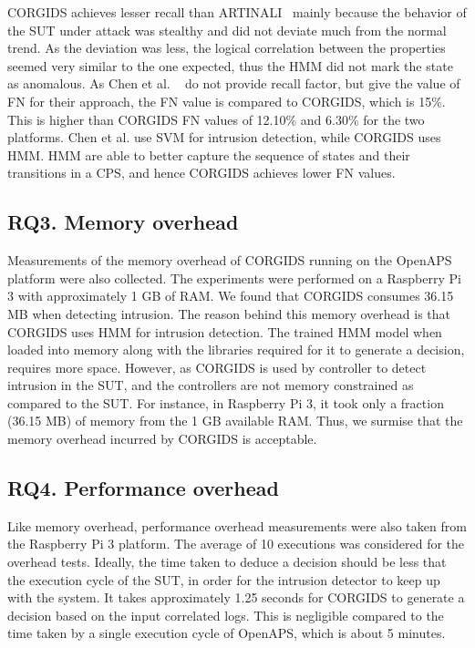  
\ac{CORGIDS} achieves lesser recall than ARTINALI~\cite{aliabadi2017artinali} mainly because the behavior of the \ac{SUT} under attack was stealthy and did not deviate much from the normal trend. As the deviation was less, the logical correlation between the properties seemed very similar to the one expected, thus the \ac{HMM} did not mark the state as anomalous. As Chen et al. ~\cite{chen2018learning} do not provide recall factor, but give the value of \ac{FN} for their approach, the \ac{FN} value is compared to \ac{CORGIDS}, which is 15\%. This is higher than \ac{CORGIDS} \ac{FN} values of 12.10\% and 6.30\% for the two platforms. Chen et al. use \ac{SVM} for intrusion detection, while \ac{CORGIDS} uses \ac{HMM}. \ac{HMM} are able to better capture the sequence of states and their transitions in a \ac{CPS}, and hence \ac{CORGIDS} achieves lower \ac{FN} values.

\subsection{RQ3. Memory overhead}
Measurements of the memory overhead of \ac{CORGIDS} running on the \ac{OpenAPS} platform were also collected. The experiments were performed on a Raspberry Pi 3 with approximately 1 GB of RAM. We found that \ac{CORGIDS} consumes 36.15 MB when detecting intrusion. The reason behind this memory overhead is that \ac{CORGIDS} uses \ac{HMM} for intrusion detection. The trained \ac{HMM} model when loaded into memory along with the libraries required for it to generate a decision, requires more space. However, as \ac{CORGIDS} is used by controller to detect intrusion in the \ac{SUT}, and the controllers are not memory constrained as compared to the \ac{SUT}. For instance, in Raspberry Pi 3, it took only a fraction (36.15 MB) of memory from the 1 GB available RAM. Thus, we surmise that the memory overhead incurred by \ac{CORGIDS} is acceptable.

\subsection{RQ4. Performance overhead}
Like memory overhead, performance overhead measurements were also taken from the Raspberry Pi 3 platform. The average of 10 executions was considered for the overhead tests.  
Ideally, the time taken to deduce a decision should be less that the execution cycle of the \ac{SUT}, in order for the intrusion detector to keep up with the system. It takes approximately 1.25 seconds for \ac{CORGIDS} to generate a decision based on the input correlated logs. This is negligible compared to the time taken by a single execution cycle of \ac{OpenAPS}, which is about 5 minutes.

